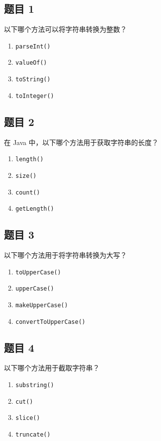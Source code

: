 \documentclass[12pt,a4paper]{ctexart}
\begin{document}
\subsection*{题目 1}
以下哪个方法可以将字符串转换为整数？
\begin{enumerate}[label=\Alph*.]
    \item \texttt{parseInt()}
    \item \texttt{valueOf()}
    \item \texttt{toString()}
    \item \texttt{toInteger()}
\end{enumerate}

\subsection*{题目 2}
在 Java 中，以下哪个方法用于获取字符串的长度？
\begin{enumerate}[label=\Alph*.]
    \item \texttt{length()}
    \item \texttt{size()}
    \item \texttt{count()}
    \item \texttt{getLength()}
\end{enumerate}

\subsection*{题目 3}
以下哪个方法用于将字符串转换为大写？
\begin{enumerate}[label=\Alph*.]
    \item \texttt{toUpperCase()}
    \item \texttt{upperCase()}
    \item \texttt{makeUpperCase()}
    \item \texttt{convertToUpperCase()}
\end{enumerate}

\subsection*{题目 4}
以下哪个方法用于截取字符串？
\begin{enumerate}[label=\Alph*.]
    \item \texttt{substring()}
    \item \texttt{cut()}
    \item \texttt{slice()}
    \item \texttt{truncate()}
\end{enumerate}
\end{document}
